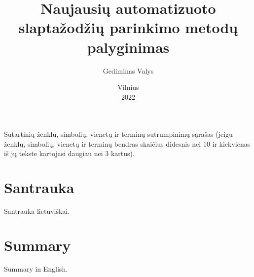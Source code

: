 \documentclass{VUMIFInfBakalaurinis}
\institute{Informatikos institutas}
\title{Naujausių automatizuoto slaptažodžių parinkimo metodų palyginimas}
\author{Gediminas Valys}
\date{Vilnius \\ 2022}
\begin{document}
\maketitle

\tableofcontents

Sutartinių ženklų, simbolių, vienetų ir terminų sutrumpinimų sąrašas (jeigu
ženklų, simbolių, vienetų ir terminų bendras skaičius didesnis nei 10 ir
kiekvienas iš jų tekste kartojasi daugiau nei 3 kartus).

\section{Santrauka}
Santrauka lietuviškai.

\section{Summary}
Summary in English.
\end{document}
